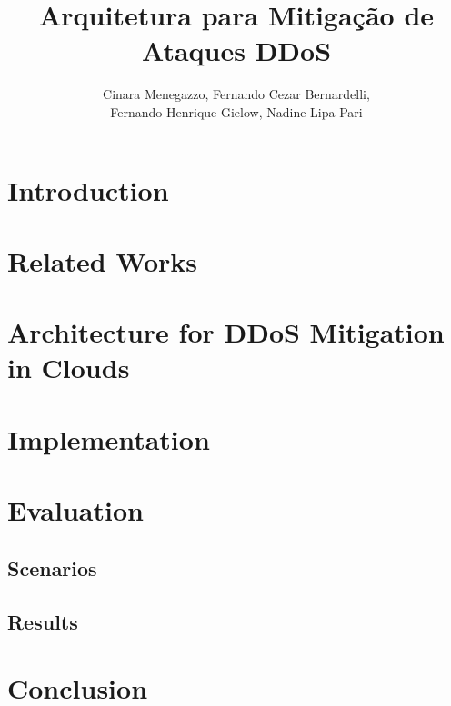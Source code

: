 \documentclass[a4paper, 12pt]{article}
\begin{document}
\title{Arquitetura para Mitigação de Ataques DDoS}

\author{
Cinara Menegazzo,
Fernando Cezar Bernardelli, \\
Fernando Henrique Gielow,
Nadine Lipa Pari
}
   

   
\address{Departamento de Informática -- Universidade Federal do Paraná\\
NR2 - Núcleo de Redes Sem Fio e Redes Avançadas\\
  Caixa Postal 19.081 -- 81.531-980 -- Curitiba -- PR -- Brasil
}     

\maketitle


\begin{abstract}

\end{abstract}



\section{Introduction}


\section{Related Works}


\section{Architecture for DDoS Mitigation in Clouds}


\section{Implementation}


\section{Evaluation}


\subsection{Scenarios}


\subsection{Results}


\section{Conclusion}



% 



\end{document}
